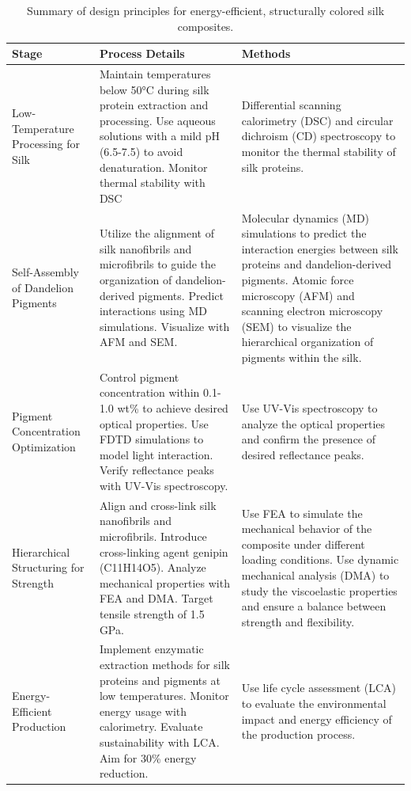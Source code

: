\documentclass{article}
\begin{document}
\begin{table}[th!]
 \centering
\caption{Summary of design principles for energy-efficient, structurally colored silk composites.}
\begin{tabularx}{1.0\textwidth}{XXX}
\toprule
 \textbf{Stage} & \textbf{Process Details} & \textbf{Methods}
\tabularnewline
\midrule
 Low-Temperature Processing for Silk &  Maintain temperatures below 50°C during silk protein extraction and processing. Use aqueous solutions with a mild pH (6.5-7.5) to avoid denaturation. Monitor thermal stability with DSC & Differential scanning calorimetry (DSC) and circular dichroism (CD) spectroscopy to monitor the thermal stability of silk proteins.
\tabularnewline
\midrule
Self-Assembly of Dandelion Pigments & Utilize the alignment of silk nanofibrils and microfibrils to guide the organization of dandelion-derived pigments. Predict interactions using MD simulations. Visualize with AFM and SEM. & Molecular dynamics (MD) simulations to predict the interaction energies between silk proteins and dandelion-derived pigments. Atomic force microscopy (AFM) and scanning electron microscopy (SEM) to visualize the hierarchical organization of pigments within the silk.
\tabularnewline
\midrule
Pigment Concentration Optimization & Control pigment concentration within 0.1-1.0 wt\% to achieve desired optical properties. Use FDTD simulations to model light interaction. Verify reflectance peaks with UV-Vis spectroscopy. & Use UV-Vis spectroscopy to analyze the optical properties and confirm the presence of desired reflectance peaks.
\tabularnewline
\midrule
Hierarchical Structuring for Strength &  Align and cross-link silk nanofibrils and microfibrils. Introduce cross-linking agent genipin (C11H14O5). Analyze mechanical properties with FEA and DMA. Target tensile strength of 1.5 GPa. & Use FEA to simulate the mechanical behavior of the composite under different loading conditions. Use dynamic mechanical analysis (DMA) to study the viscoelastic properties and ensure a balance between strength and flexibility.
\tabularnewline
\midrule
Energy-Efficient Production & Implement enzymatic extraction methods for silk proteins and pigments at low temperatures. Monitor energy usage with calorimetry. Evaluate sustainability with LCA. Aim for 30\% energy reduction. & Use life cycle assessment (LCA) to evaluate the environmental impact and energy efficiency of the production process.
\tabularnewline
\midrule
\end{tabularx}
\label{tbl:design_principles}
\end{table}
\end{document}
